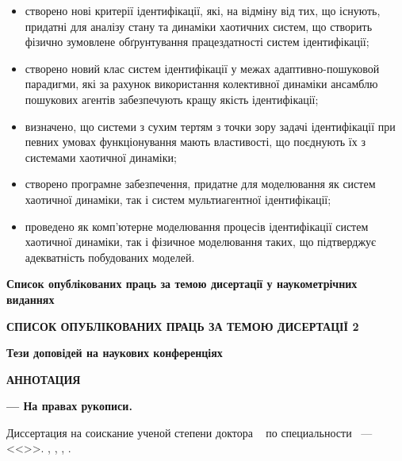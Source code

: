 \documentclass[a4paper,13pt]{atuaref}
\newcommand{\xsect}[1]{\medskip\begin{center}\textbf{#1}\end{center}\medskip\penalty10000}
\begin{document}
\begin{itemize}

  \item
  створено нові критерії ідентифікації, які, на відміну від тих, що
  існують, придатні для аналізу стану та динаміки
  хаотичних систем, що створить фізично зумовлене обґрунтування працездатності систем
  ідентифікації;

  \item
  створено новий клас систем ідентифікації у межах
    адаптивно-пошуковой парадигми,
    які за рахунок використання колективної динаміки
    ансамблю пошукових агентів забезпечують
    кращу якість ідентифікації;

  \item
   визначено, що системи з сухим тертям з точки зору задачі ідентифікації
   при певних  умовах функціонування
   мають властивості, що поєднують їх з системами хаотичної динаміки;

 \item
  створено програмне забезпечення, придатне для моделювання як систем
  хаотичної динаміки, так і систем мультиагентної ідентифікації;

  \item
  проведено як комп'ютерне моделювання процесів ідентифікації систем
    хаотичної динаміки, так і фізичное моделювання таких, що підтверджує адекватність
    побудованих моделей.


\end{itemize}



\nocite{*}

\xsect{Список опублікованих праць за темою дисертації у наукометрічних виданнях}

\printbibliography[heading=none, keyword=scimetr]


\xsect{СПИСОК ОПУБЛІКОВАНИХ ПРАЦЬ ЗА ТЕМОЮ ДИСЕРТАЦІЇ 2}

\printbibliography[heading=none, keyword=vak]



\xsect{Тези доповідей на наукових конференціях}

\printbibliography[heading=none, keyword=confer]



\xsect{АННОТАЦИЯ}

\textbf{\dissauthorRu}
\textbf{\booknameRu}
\textbf{--- На правах рукописи.}

Диссертация на соискание ученой степени
доктора
\dissScopeRu\ {}
по специальности
\dissSpecId\ --- <<\dissSpecRu>>.
\institutionRu, \belongRu, \cityRu, \bookyear.
\end{document}
